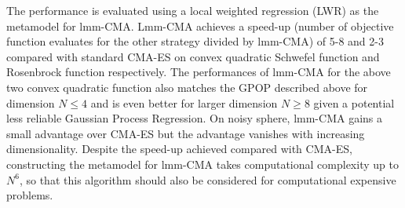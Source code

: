 The performance is evaluated using a local weighted regression (LWR) \cite{atkeson1997locally} as the metamodel for lmm-CMA. Lmm-CMA achieves a speed-up (number of objective function evaluates for the other strategy divided by lmm-CMA) of 5-8 and 2-3 compared with standard CMA-ES \cite{hansen2004evaluating} on convex quadratic Schwefel function and Rosenbrock function respectively. The performances of lmm-CMA for the above two convex quadratic function also matches the GPOP described above for dimension $N\leq 4$ and is even better for larger dimension $N\geq 8$ given a potential less reliable Gaussian Process Regression. On noisy sphere, lmm-CMA gains a small advantage over CMA-ES but the advantage vanishes with increasing dimensionality. Despite the speed-up achieved compared with CMA-ES, constructing the metamodel for lmm-CMA takes computational complexity up to $N^6$, so that this algorithm should also be considered for computational expensive problems. 









